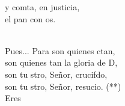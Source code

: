 \begin{cancion}
	y comta, en justicia, \\
	el pan con os.\\\jump\\
	\begin{chorus}%
	Pues... Para  son quienes ctan,\\
	son quienes tan la gloria de D,\\
	son tu stro, Señor, crucifdo,\\
	son tu stro, Señor, resucio. (**)\\
	Eres  \\
	\end{chorus}%
	\jump\\
\end{cancion}%
